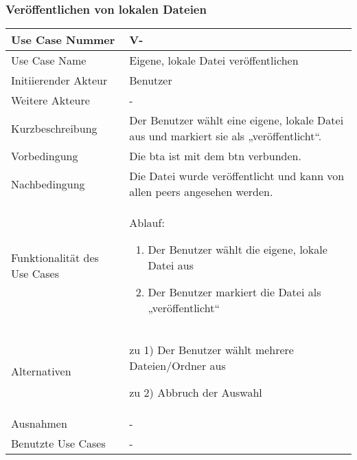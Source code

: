 \subsubsection{Veröffentlichen von lokalen Dateien}
\begin{center}
	\begin{tabular}{|l|p{10cm}|}
		\hline
		Use Case Nummer & V-\useusercounter \\
		\hline
		Use Case Name & Eigene, lokale Datei veröffentlichen \\
		\hline
		Initiierender Akteur & Benutzer \\
		\hline
		Weitere Akteure &  - \\
		\hline
		Kurzbeschreibung & Der Benutzer wählt eine eigene, lokale Datei aus und markiert sie als „ver\-öffentlicht“.\\
		\hline
		Vorbedingung & Die \gls{bta} ist mit dem \gls{btn} verbunden. \\
		\hline
		Nachbedingung & Die Datei wurde veröffentlicht und kann von allen \gls{peer}s angesehen werden. \\
		\hline
		Funktionalität des Use Cases &
		Ablauf:
		\begin{enumerate}
			\item Der Benutzer wählt die eigene, lokale Datei aus
			\item Der Benutzer markiert die Datei als „veröffentlicht“
		\end{enumerate}\\
		\hline
		Alternativen &
		\begin{description}
			\item zu 1) Der Benutzer wählt mehrere Dateien/Ordner aus
			\item zu 2) Abbruch der Auswahl
		\end{description}\\
		\hline
		Ausnahmen & - \\
		\hline
		Benutzte Use Cases & - \\
		\hline
	\end{tabular}
\end{center}

\newpage
 
